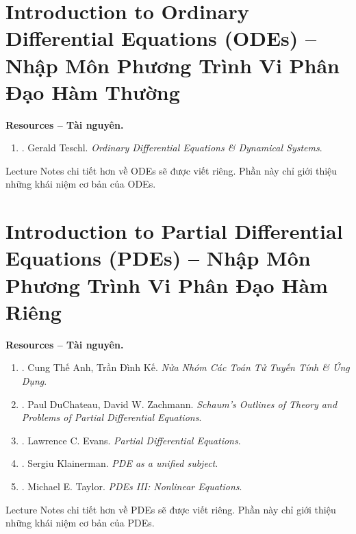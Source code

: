 \documentclass[oneside]{book}
\begin{document}
\part{Introduction to Ordinary Differential Equations (ODEs) -- Nhập Môn Phương Trình Vi Phân Đạo Hàm Thường}
\minitoc
\textbf{\textsf{Resources -- Tài nguyên.}}
\begin{enumerate}
	\item \cite{Teschl2012}. {\sc Gerald Teschl}. {\it Ordinary Differential Equations \& Dynamical Systems}.
\end{enumerate}
Lecture Notes chi tiết hơn về ODEs sẽ được viết riêng. Phần này chỉ giới thiệu những khái niệm cơ bản của ODEs.


\part{Introduction to Partial Differential Equations (PDEs) -- Nhập Môn Phương Trình Vi Phân Đạo Hàm Riêng}
\minitoc
\textbf{\textsf{Resources -- Tài nguyên.}}
\begin{enumerate}
	\item \cite{Anh_Ke_semigroup}. {\sc Cung Thế Anh, Trần Đình Kế}. {\it Nửa Nhóm Các Toán Tử Tuyến Tính \& Ứng Dụng}.
	
	\item \cite{DuChateau_Zachmann_PDEs}. {\sc Paul DuChateau, David W. Zachmann}. {\it Schaum's Outlines of Theory and Problems of Partial Differential Equations}.
	
	\item \cite{Evans2010}. {\sc Lawrence C. Evans}. {\it Partial Differential Equations}.
	
	\item \cite{Klainerman2000}. {\sc Sergiu Klainerman}. {\it PDE as a unified subject}.
	
	\item \cite{Taylor2011}. {\sc Michael E. Taylor}. {\it PDEs III: Nonlinear Equations}.
\end{enumerate}
Lecture Notes chi tiết hơn về PDEs sẽ được viết riêng. Phần này chỉ giới thiệu những khái niệm cơ bản của PDEs.

\end{document}
